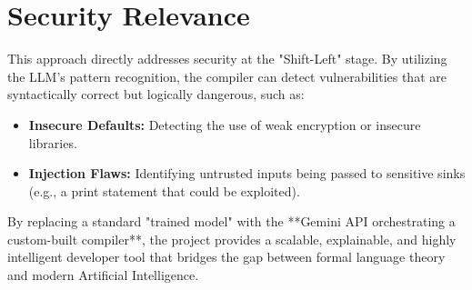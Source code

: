 \documentclass[a4paper,12pt]{article}
\begin{document}
\section{Security Relevance}
This approach directly addresses security at the "Shift-Left" stage. By utilizing the LLM's pattern recognition, the compiler can detect vulnerabilities that are syntactically correct but logically dangerous, such as:
\begin{itemize}
    \item \textbf{Insecure Defaults:} Detecting the use of weak encryption or insecure libraries.
    \item \textbf{Injection Flaws:} Identifying untrusted inputs being passed to sensitive sinks (e.g., a print statement that could be exploited).
\end{itemize}

\begin{tcolorbox}[colback=blue!5!white,colframe=blue!75!black,title=Summary of Innovation]
By replacing a standard "trained model" with the **Gemini API orchestrating a custom-built compiler**, the project provides a scalable, explainable, and highly intelligent developer tool that bridges the gap between formal language theory and modern Artificial Intelligence.
\end{tcolorbox}
\end{document}
